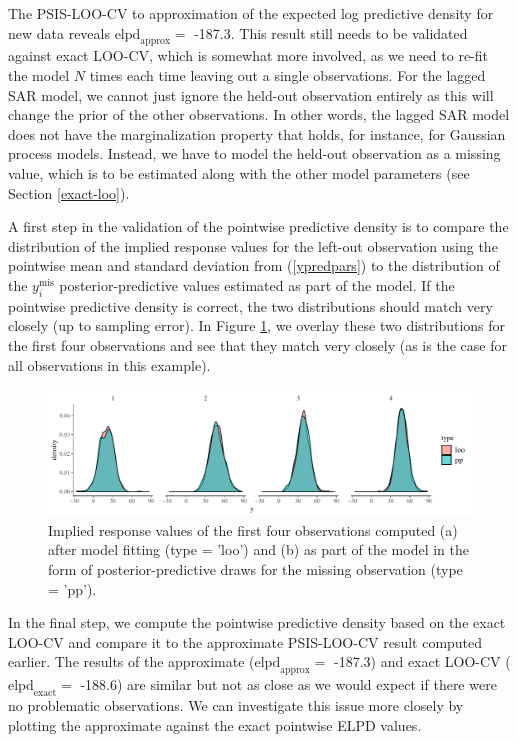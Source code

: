 \documentclass[11pt]{article}
\begin{document}
The PSIS-LOO-CV to approximation of the expected log predictive density
for new data reveals \(\text{elpd}_{\text{approx}} =\) -187.3. This
result still needs to be validated against exact LOO-CV, which is
somewhat more involved, as we need to re-fit the model \(N\) times each
time leaving out a single observations. For the lagged SAR model, we
cannot just ignore the held-out observation entirely as this will change
the prior of the other observations. In other words, the lagged SAR
model does not have the marginalization property that holds, for
instance, for Gaussian process models. Instead, we have to model the
held-out observation as a missing value, which is to be estimated along
with the other model parameters (see Section \ref{exact-loo}).

A first step in the validation of the pointwise predictive density is to
compare the distribution of the implied response values for the left-out
observation using the pointwise mean and standard deviation from
(\ref{ypredpars}) to the distribution of the \(y_i^{\mathrm{mis}}\)
posterior-predictive values estimated as part of the model. If the
pointwise predictive density is correct, the two distributions should
match very closely (up to sampling error). In Figure \ref{fig:yplots},
we overlay these two distributions for the first four observations and
see that they match very closely (as is the case for all
observations in this example).

\begin{figure}
\includegraphics[width=0.95\linewidth]{yplots-1}
\caption{
Implied response values of the first four observations computed 
(a) after model fitting (type = 'loo') and 
(b) as part of the model in the form of posterior-predictive draws for the missing observation (type = 'pp').
}
\label{fig:yplots}
\end{figure}

In the final step, we compute the pointwise predictive density based on
the exact LOO-CV and compare it to the approximate PSIS-LOO-CV result
computed earlier. The results of the approximate
(\(\text{elpd}_{\text{approx}} =\) -187.3) and exact LOO-CV
(\(\text{elpd}_{\text{exact}} =\) -188.6) are similar but not as close
as we would expect if there were no problematic observations. We can
investigate this issue more closely by plotting the approximate against
the exact pointwise ELPD values.
\end{document}
